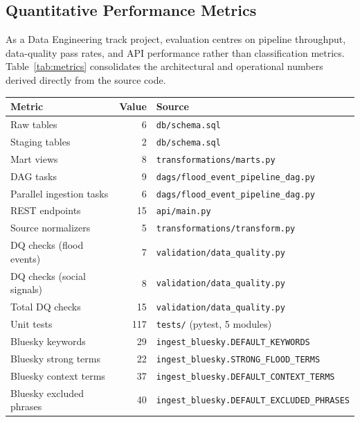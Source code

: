 \documentclass[11pt,a4paper]{article}
\begin{document}
\subsection{Quantitative Performance Metrics}

As a Data Engineering track project, evaluation centres on pipeline
throughput, data-quality pass rates, and API performance rather than
classification metrics. Table~\ref{tab:metrics} consolidates the
architectural and operational numbers derived directly from the source
code.

\begin{table}[h!]
\centering
\small
\begin{tabular}{@{}lrl@{}}
\toprule
\textbf{Metric} & \textbf{Value} & \textbf{Source} \\
\midrule
Raw tables                          & 6   & \texttt{db/schema.sql} \\
Staging tables                      & 2   & \texttt{db/schema.sql} \\
Mart views                          & 8   & \texttt{transformations/marts.py} \\
DAG tasks                           & 9   & \texttt{dags/flood\_event\_pipeline\_dag.py} \\
Parallel ingestion tasks            & 6   & \texttt{dags/flood\_event\_pipeline\_dag.py} \\
REST endpoints                      & 15  & \texttt{api/main.py} \\
Source normalizers                  & 5   & \texttt{transformations/transform.py} \\
DQ checks (flood events)            & 7   & \texttt{validation/data\_quality.py} \\
DQ checks (social signals)          & 8   & \texttt{validation/data\_quality.py} \\
Total DQ checks                     & 15  & \texttt{validation/data\_quality.py} \\
Unit tests                          & 117 & \texttt{tests/} (pytest, 5 modules) \\
Bluesky keywords                    & 29  & \texttt{ingest\_bluesky.DEFAULT\_KEYWORDS} \\
Bluesky strong terms                & 22  & \texttt{ingest\_bluesky.STRONG\_FLOOD\_TERMS} \\
Bluesky context terms               & 37  & \texttt{ingest\_bluesky.DEFAULT\_CONTEXT\_TERMS} \\
Bluesky excluded phrases            & 40  & \texttt{ingest\_bluesky.DEFAULT\_EXCLUDED\_PHRASES} \\

\end{tabular}
\end{table}
\end{document}
